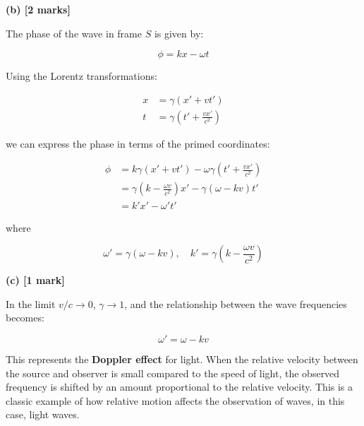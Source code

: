 \documentclass{article}
\begin{document}
\textbf{(b) [2 marks]}

The phase of the wave in frame $S$ is given by:

\[
\phi = kx - \omega t
\]

Using the Lorentz transformations:

\begin{align*}
x &= \gamma (x' + vt') \\
t &= \gamma \left( t' + \frac{vx'}{c^2} \right)
\end{align*}

we can express the phase in terms of the primed coordinates:

\begin{align*}
\phi &= k \gamma (x' + vt') - \omega \gamma \left( t' + \frac{vx'}{c^2} \right) \\
&= \gamma \left( k - \frac{\omega v}{c^2} \right) x' - \gamma (\omega - kv) t' \\
&= k' x' - \omega' t'
\end{align*}

where

\[
\omega' = \gamma (\omega - k v), \quad k' = \gamma \left( k - \frac{\omega v}{c^2} \right)
\]

\textbf{(c) [1 mark]}

In the limit $v/c \to 0$, $\gamma \to 1$, and the relationship between the wave frequencies becomes:

\[
\omega' = \omega - kv
\]

This represents the \textbf{Doppler effect} for light. When the relative velocity between the source and observer is small compared to the speed of light, the observed frequency is shifted by an amount proportional to the relative velocity. This is a classic example of how relative motion affects the observation of waves, in this case, light waves.
\end{document}
